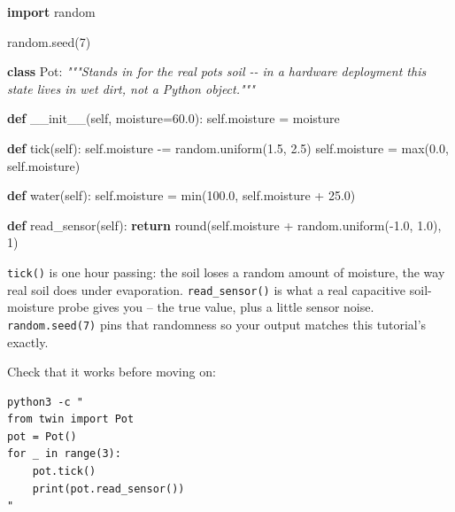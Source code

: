 \documentclass[
  12pt,
  a4paper,
]{article}
\newenvironment{Shaded}{}{}
\newcommand{\BuiltInTok}[1]{\textcolor[rgb]{0.00,0.50,0.00}{#1}}
\newcommand{\CommentTok}[1]{\textcolor[rgb]{0.38,0.63,0.69}{\textit{#1}}}
\newcommand{\ControlFlowTok}[1]{\textcolor[rgb]{0.00,0.44,0.13}{\textbf{#1}}}
\newcommand{\DecValTok}[1]{\textcolor[rgb]{0.25,0.63,0.44}{#1}}
\newcommand{\FloatTok}[1]{\textcolor[rgb]{0.25,0.63,0.44}{#1}}
\newcommand{\FunctionTok}[1]{\textcolor[rgb]{0.02,0.16,0.49}{#1}}
\newcommand{\ImportTok}[1]{\textcolor[rgb]{0.00,0.50,0.00}{\textbf{#1}}}
\newcommand{\KeywordTok}[1]{\textcolor[rgb]{0.00,0.44,0.13}{\textbf{#1}}}
\newcommand{\NormalTok}[1]{#1}
\newcommand{\OperatorTok}[1]{\textcolor[rgb]{0.40,0.40,0.40}{#1}}
\newcommand{\VariableTok}[1]{\textcolor[rgb]{0.10,0.09,0.49}{#1}}
\begin{document}
\begin{Shaded}
\begin{Highlighting}[]
\ImportTok{import}\NormalTok{ random}

\NormalTok{random.seed(}\DecValTok{7}\NormalTok{)}


\KeywordTok{class}\NormalTok{ Pot:}
    \CommentTok{"""Stands in for the real pot\textquotesingle{}s soil {-}{-} in a hardware deployment this}
\CommentTok{    state lives in wet dirt, not a Python object."""}

    \KeywordTok{def} \FunctionTok{\_\_init\_\_}\NormalTok{(}\VariableTok{self}\NormalTok{, moisture}\OperatorTok{=}\FloatTok{60.0}\NormalTok{):}
        \VariableTok{self}\NormalTok{.moisture }\OperatorTok{=}\NormalTok{ moisture}

    \KeywordTok{def}\NormalTok{ tick(}\VariableTok{self}\NormalTok{):}
        \VariableTok{self}\NormalTok{.moisture }\OperatorTok{{-}=}\NormalTok{ random.uniform(}\FloatTok{1.5}\NormalTok{, }\FloatTok{2.5}\NormalTok{)}
        \VariableTok{self}\NormalTok{.moisture }\OperatorTok{=} \BuiltInTok{max}\NormalTok{(}\FloatTok{0.0}\NormalTok{, }\VariableTok{self}\NormalTok{.moisture)}

    \KeywordTok{def}\NormalTok{ water(}\VariableTok{self}\NormalTok{):}
        \VariableTok{self}\NormalTok{.moisture }\OperatorTok{=} \BuiltInTok{min}\NormalTok{(}\FloatTok{100.0}\NormalTok{, }\VariableTok{self}\NormalTok{.moisture }\OperatorTok{+} \FloatTok{25.0}\NormalTok{)}

    \KeywordTok{def}\NormalTok{ read\_sensor(}\VariableTok{self}\NormalTok{):}
        \ControlFlowTok{return} \BuiltInTok{round}\NormalTok{(}\VariableTok{self}\NormalTok{.moisture }\OperatorTok{+}\NormalTok{ random.uniform(}\OperatorTok{{-}}\FloatTok{1.0}\NormalTok{, }\FloatTok{1.0}\NormalTok{), }\DecValTok{1}\NormalTok{)}
\end{Highlighting}
\end{Shaded}

\texttt{tick()} is one hour passing: the soil loses a random amount of
moisture, the way real soil does under evaporation.
\texttt{read\_sensor()} is what a real capacitive soil-moisture probe
gives you -- the true value, plus a little sensor noise.
\texttt{random.seed(7)} pins that randomness so your output matches this
tutorial's exactly.

Check that it works before moving on:

\begin{verbatim}
python3 -c "
from twin import Pot
pot = Pot()
for _ in range(3):
    pot.tick()
    print(pot.read_sensor())
"
\end{verbatim}
\end{document}
